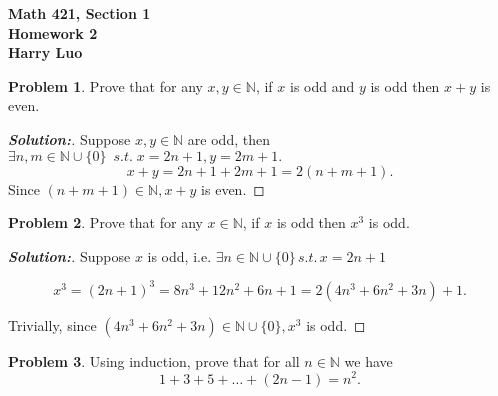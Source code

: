 \documentclass[12pt]{article}
\theoremstyle{definition}\newtheorem{problem}{Problem}
\newenvironment{solution}{\begin{proof}[\bfseries\textup{Solution:}]}{\end{proof}}
\begin{document}

\begin{center}
\bfseries Math 421, Section 1 
\\ 
Homework 2
\\ 
Harry Luo %
\\ [24pt] 
\end{center}

\begin{problem}
Prove that for any $x,y\in\mathbb{N}$, if $x$ is odd and $y$ is odd then $x+y$ is even.
\end{problem}


\begin{solution} 
    Suppose $ x, y \in \mathbb{N} $ are odd, then $ \exists n, m \in \mathbb{N} \cup \{0\} \ \; s.t. \; x = 2n+1, y = 2m+1. $ 
    \begin{equation}
         x+y = 2 n + 1 + 2 m + 1 = 2(n + m + 1). 
    \end{equation}  
    Since $ (n + m + 1) \in \mathbb{N}, x+y $ is even.  
\end{solution}

\newpage
\begin{problem}
Prove that for any $x\in\mathbb{N}$, if $x$ is odd then $x^3$ is odd.
\end{problem}

\begin{solution}


Suppose $ x  $ is odd, i.e. $ \exists n \in \mathbb{N} \cup \{0\} \, s.t.\, x=2n+1$ 

\begin{equation} x^3 = (2n+1)^3 = 8n^3 + 12n^2 + 6n + 1 = 2(4n^3 + 6n^2 + 3n) + 1. \end{equation} 

    Trivially, since $ (4n^3 + 6n^2 + 3n) \in \mathbb{N} \cup \{0\}, x^3 $ is odd.

\end{solution} 



\newpage
\begin{problem}
Using induction, prove that for all $n\in\mathbb{N}$ we have
\begin{equation*}
1+3+5+\dots+(2n-1) = n^2 .
\end{equation*}
\end{problem}
\end{document}
